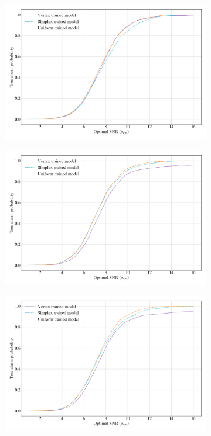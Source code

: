 \documentclass[12pt]{iopart}
\begin{document}
\begin{figure}[h!] %
\centering
\begin{subfigure}{0.7\textwidth}
\includegraphics[width=\linewidth]{figures/efficiency_curve_vtest.png}
\end{subfigure}

\begin{subfigure}{0.7\textwidth}
\centering
\includegraphics[width=\linewidth]{figures/efficiency_curve_stest.png}
\end{subfigure}

\begin{subfigure}{0.7\textwidth}
\centering
\includegraphics[width=\linewidth]{figures/efficiency_curve_utest.png}
\end{subfigure}


\end{figure}
\end{document}
